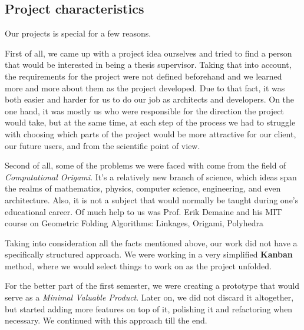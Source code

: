 \subsection{Project characteristics}

Our projects is special for a few reasons.

First of all, we came up with a project idea ourselves and tried to find a person that would be interested in being a thesis supervisor.
Taking that into account, the requirements for the project were not defined beforehand
and we learned more and more about them as the project developed.
Due to that fact, it was both easier and harder for us to do our job as architects and developers.
On the one hand, it was mostly us who were responsible for the direction the project would take, but at the same time, at each step of the process
we had to struggle with choosing which parts of the project would be more attractive for our client, our future users, and from the scientific point of view.

Second of all, some of the problems we were faced with come from the field of \textit{Computational Origami}.
It's a relatively new branch of science, which ideas span the realms of mathematics, physics, 
computer science, engineering, and even architecture.
Also, it is not a subject that would normally be taught during one's educational career.
Of much help to us was Prof. Erik Demaine and his MIT course on Geometric Folding Algorithms: Linkages, Origami, Polyhedra \cite{mit-course}
\smallskip

Taking into consideration all the facts mentioned above, our work did not have a specifically structured approach.
We were working in a very simplified \textbf{Kanban} method, where we would select things to work on
as the project unfolded. 
\smallskip

For the better part of the first semester,
we were creating a prototype that would serve as a \textit{Minimal Valuable Product}.
Later on, we did not discard it altogether, but started adding more features on top of it,
polishing it and refactoring when necessary. 
We continued with this approach till the end.

